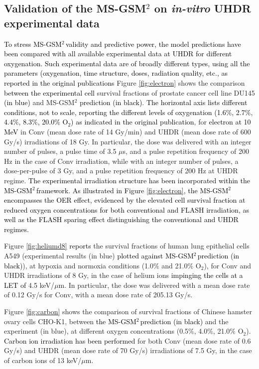 \documentclass[10pt]{iopart}
\newcommand{\gsm}{MS-GSM$^2\,$}
\newcommand{\fra}[1]{\textcolor{black}{#1}}
\newcommand{\ema}[1]{\textcolor{black}{#1}}
\numberwithin{table}{section}
\begin{document}
\subsection*{Validation of the MS-GSM$^2$ on \textit{in-vitro} UHDR experimental data}\label{SEC:Val}

\ema{To stress \gsm validity and predictive power,} \fra{the model predictions have been compared with all available experimental data at UHDR for different oxygenation. Such experimental data are of broadly different types, using all the parameters (oxygenation, time structure, doses, radiation quality, etc., as reported in the original publications}
Figure \ref{fig:electron} shows the comparison \fra{between the experimental cell} survival fractions of prostate cancer cell line DU145 \cite{Adrian2020} \fra{(in blue)} and MS-GSM$^2$ \fra{prediction (in black)}. \fra{The horizontal axis} \ema{lists different conditions, not to scale, reporting the different levels of oxygenation (1.6$\%$, 2.7$\%$, 4.4$\%$, 8.3$\%$, 20.0$\%$ $\mathrm{O_2}$) as indicated in the original publication}, for \fra{electron at 10 MeV} in Conv (mean dose rate of 14 Gy/min) and UHDR (mean dose rate of 600 Gy/s) irradiations of 18 Gy. In particular, the dose was delivered with an integer number of pulses, a pulse time of 3.5 $\mu$s, and a pulse repetition frequency of 200 Hz in the case of Conv irradiation, while with an integer number of pulses, a dose-per-pulse of 3 Gy, and a pulse repetition frequency of 200 Hz at UHDR regime. \fra{The experimental irradiation structure has been incorporated within the \gsm framework. As illustrated in Figure \ref{fig:electron}, the \gsm encompasses the OER effect, evidenced by the elevated cell survival fraction at reduced oxygen concentrations for both conventional and FLASH irradiation, as well as the FLASH sparing effect distinguishing the conventional and UHDR regimes.}   

Figure \ref{fig:heliumd8} \ema{reports} the survival fractions of human lung epithelial cells A549 (experimental \cite{Tessonnier2021} results (in blue) \fra{plotted against \gsm prediction (in black)}), at hypoxia and normoxia conditions (1.0$\%$ and 21.0$\%$ $\mathrm{O_2}$), for Conv and UHDR irradiations of 8 Gy, in the case of helium ions \ema{impinging the cells at a LET of}  4.5 keV/$\mu$m. In particular, the dose was delivered with a mean dose rate of 0.12 Gy/s for Conv, with a mean dose rate of 205.13 Gy/s. 

Figure \ref{fig:carbon} shows the comparison of survival fractions of Chinese hamster ovary cells CHO-K1, between \fra{the \gsm prediction (in black)} and the experiment \cite{Tinganelliinvitro2022} (in blue), at different oxygen concentrations (0.5$\%$, 4.0$\%$, 21.0$\%$ $\mathrm{O_2}$). \fra{Carbon ion irradiation has been performed} for both Conv (mean dose rate of 0.6 Gy/s) and UHDR (mean dose rate of 70 Gy/s) irradiations of 7.5 Gy, in the case of carbon ions of 13 keV/$\mu$m. 
\end{document}
